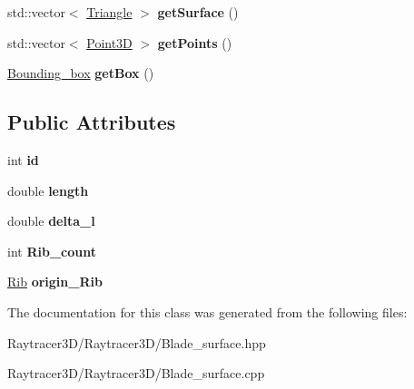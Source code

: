 \begin{DoxyCompactItemize}
\item 
\hypertarget{class_blade__surface_a91f5bbe72574182ee6ad9e4014bfebbf}{}\label{class_blade__surface_a91f5bbe72574182ee6ad9e4014bfebbf} 
std\+::vector$<$ \hyperlink{class_triangle}{Triangle} $>$ {\bfseries get\+Surface} ()
\item 
\hypertarget{class_blade__surface_ae2f4aa670e4d320d63c77feffb953ae0}{}\label{class_blade__surface_ae2f4aa670e4d320d63c77feffb953ae0} 
std\+::vector$<$ \hyperlink{class_point3_d}{Point3D} $>$ {\bfseries get\+Points} ()
\item 
\hypertarget{class_blade__surface_a72fcd5b6eeb88c4e18da0ad267b27a93}{}\label{class_blade__surface_a72fcd5b6eeb88c4e18da0ad267b27a93} 
\hyperlink{class_bounding__box}{Bounding\+\_\+box} {\bfseries get\+Box} ()
\end{DoxyCompactItemize}
\subsection*{Public Attributes}
\begin{DoxyCompactItemize}
\item 
\hypertarget{class_blade__surface_afd3c87a82f107470cea4d3c8c1f5ee78}{}\label{class_blade__surface_afd3c87a82f107470cea4d3c8c1f5ee78} 
int {\bfseries id}
\item 
\hypertarget{class_blade__surface_a23f1ef284f842b523cb4b44235c0cdd7}{}\label{class_blade__surface_a23f1ef284f842b523cb4b44235c0cdd7} 
double {\bfseries length}
\item 
\hypertarget{class_blade__surface_ab1e364b4402fa787dea7d3b601e33778}{}\label{class_blade__surface_ab1e364b4402fa787dea7d3b601e33778} 
double {\bfseries delta\+\_\+l}
\item 
\hypertarget{class_blade__surface_a9ff7e20545a1fbb7ad84b00adb35f070}{}\label{class_blade__surface_a9ff7e20545a1fbb7ad84b00adb35f070} 
int {\bfseries Rib\+\_\+count}
\item 
\hypertarget{class_blade__surface_af1982ac4bb6460c4bae24868bd93e8d5}{}\label{class_blade__surface_af1982ac4bb6460c4bae24868bd93e8d5} 
\hyperlink{class_rib}{Rib} {\bfseries origin\+\_\+\+Rib}
\end{DoxyCompactItemize}


The documentation for this class was generated from the following files\+:\begin{DoxyCompactItemize}
\item 
Raytracer3\+D/\+Raytracer3\+D/Blade\+\_\+surface.\+hpp\item 
Raytracer3\+D/\+Raytracer3\+D/Blade\+\_\+surface.\+cpp\end{DoxyCompactItemize}
